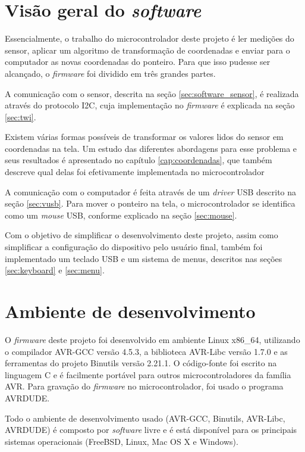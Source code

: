 \documentclass[brazil,pagestart=firstchapter]{abnt}
\begin{document}
\section{Visão geral do \textit{software}}
\label{sec:software_visao_geral}

Essencialmente, o trabalho do microcontrolador deste projeto é ler medições
do sensor, aplicar um algoritmo de transformação de coordenadas e enviar
para o computador as novas coordenadas do ponteiro. Para que isso pudesse
ser alcançado, o \textit{firmware} foi dividido em três grandes partes.

A comunicação com o sensor, descrita  na seção \ref{sec:software_sensor},
é realizada através do protocolo \ac{I2C}, cuja implementação no
\textit{firmware} é explicada na seção \ref{sec:twi}.

Existem várias formas possíveis de transformar os valores lidos do sensor em
coordenadas na tela. Um estudo das diferentes abordagens para esse problema
e seus resultados é apresentado no capítulo \ref{cap:coordenadas}, que também
descreve qual delas foi efetivamente implementada no microcontrolador

A comunicação com o computador é feita através de um \textit{driver}
\ac{USB} descrito na seção \ref{sec:vusb}. Para mover o ponteiro na tela, o
microcontrolador se identifica como um \textit{mouse} \ac{USB}, conforme
explicado na seção \ref{sec:mouse}.

Com o objetivo de simplificar o desenvolvimento deste projeto, assim como
simplificar a configuração do dispositivo pelo usuário final, também foi
implementado um teclado \ac{USB} e um sistema de menus, descritos nas seções
\ref{sec:keyboard} e \ref{sec:menu}.


\section{Ambiente de desenvolvimento}
\label{sec:software_ambiente}

O \textit{firmware} deste projeto foi desenvolvido em ambiente Linux x86\_64,
utilizando o compilador AVR-GCC versão 4.5.3, a biblioteca AVR-Libc versão
1.7.0 e as ferramentas do projeto Binutils versão 2.21.1. O código-fonte foi
escrito na linguagem C e é facilmente portável para outros
microcontroladores da família AVR. Para gravação do \textit{firmware} no
microcontrolador, foi usado o programa AVRDUDE.

Todo o ambiente de desenvolvimento usado (AVR-GCC, Binutils, AVR-Libc,
AVRDUDE) é composto por \textit{software} livre e é está disponível para os
principais sistemas operacionais (FreeBSD, Linux, Mac OS X e Windows).
\cite{avrlibcoverview}
\end{document}

